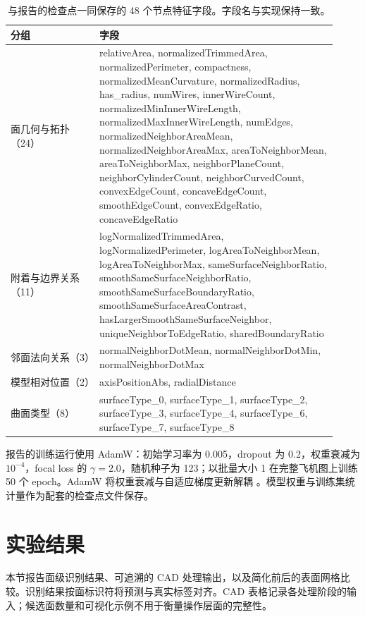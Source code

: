 \documentclass[12pt,a4paper]{ctexart}
\begin{document}
\begin{table}[!ht]
\centering
\scriptsize
\caption{与报告的检查点一同保存的 48 个节点特征字段。字段名与实现保持一致。}\label{tab:node_feature_contract}
\begin{tabular}{p{0.25\linewidth}p{0.67\linewidth}}
\toprule
分组 & 字段 \\
\midrule
面几何与拓扑（24） & relativeArea, normalizedTrimmedArea, normalizedPerimeter, compactness, normalizedMeanCurvature, normalizedRadius, has\_radius, numWires, innerWireCount, normalizedMinInnerWireLength, normalizedMaxInnerWireLength, numEdges, normalizedNeighborAreaMean, normalizedNeighborAreaMax, areaToNeighborMean, areaToNeighborMax, neighborPlaneCount, neighborCylinderCount, neighborCurvedCount, convexEdgeCount, concaveEdgeCount, smoothEdgeCount, convexEdgeRatio, concaveEdgeRatio \\
附着与边界关系（11） & logNormalizedTrimmedArea, logNormalizedPerimeter, logAreaToNeighborMean, logAreaToNeighborMax, sameSurfaceNeighborRatio, smoothSameSurfaceNeighborRatio, smoothSameSurfaceBoundaryRatio, smoothSameSurfaceAreaContrast, hasLargerSmoothSameSurfaceNeighbor, uniqueNeighborToEdgeRatio, sharedBoundaryRatio \\
邻面法向关系（3） & normalNeighborDotMean, normalNeighborDotMin, normalNeighborDotMax \\
模型相对位置（2） & axisPositionAbs, radialDistance \\
曲面类型（8） & surfaceType\_0, surfaceType\_1, surfaceType\_2, surfaceType\_3, surfaceType\_4, surfaceType\_6, surfaceType\_7, surfaceType\_8 \\
\bottomrule
\end{tabular}
\end{table}

报告的训练运行使用 AdamW：初始学习率为 0.005，dropout 为 0.2，权重衰减为 $10^{-4}$，focal loss 的 $\gamma=2.0$，随机种子为 123；以批量大小 1 在完整飞机图上训练 50 个 epoch。AdamW 将权重衰减与自适应梯度更新解耦 \parencite{loshchilov2019adamw}。模型权重与训练集统计量作为配套的检查点文件保存。

\section{实验结果}\label{sec:results}

本节报告面级识别结果、可追溯的 CAD 处理输出，以及简化前后的表面网格比较。识别结果按面标识符将预测与真实标签对齐。CAD 表格记录各处理阶段的输入；候选面数量和可视化示例不用于衡量操作层面的完整性。
\end{document}
